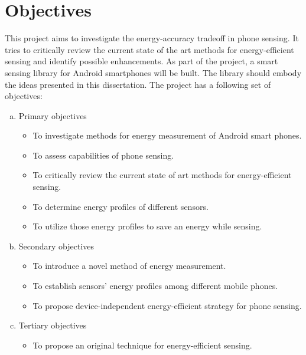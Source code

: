 \section{Objectives}
\label{s:objectives}
This project aims to investigate the energy-accuracy tradeoff in phone sensing. It tries to critically review the current state of the art methods for energy-efficient sensing and identify possible enhancements. As part of the project, a smart sensing library for Android smartphones will be built. The library should embody the ideas presented in this dissertation. The project has a following set of objectives:
 

\begin{enumerate}[(a)]
 \item Primary objectives
  \begin{itemize}
  	\item To investigate methods for energy measurement of Android smart phones.
  	\item To assess capabilities of phone sensing.
  	\item To critically review the current state of art methods for energy-efficient sensing.
  	\item To determine energy profiles of different sensors.
  	\item To utilize those energy profiles to save an energy while sensing.
  \end{itemize}
  \item Secondary objectives
  \begin{itemize}
    \item To introduce a novel method of energy measurement.
  	\item To establish sensors' energy profiles among different mobile phones.
  	\item To propose device-independent energy-efficient strategy for phone sensing.
  \end{itemize}
  \item Tertiary objectives
  \begin{itemize}
   \item To propose an original technique for energy-efficient sensing.
  \end{itemize}
\end{enumerate}
